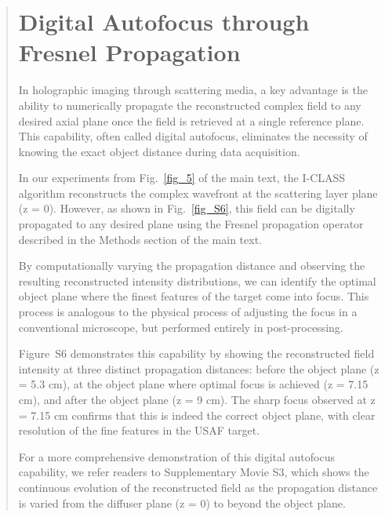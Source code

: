 \documentclass[12pt]{article}
\newenvironment{ourresponse}
    {\begin{tcolorbox}[width=\linewidth,breakable,enhanced,colback=gray!5,colframe=responsecolor!50,title=Response,left=5pt,right=5pt]}
    {\end{tcolorbox}}
\begin{document}
\begin{ourresponse}
\begin{quote}
        \section*{Digital Autofocus through Fresnel Propagation}
        
        In holographic imaging through scattering media, a key advantage is the ability to numerically propagate the reconstructed complex field to any desired axial plane once the field is retrieved at a single reference plane. This capability, often called digital autofocus, eliminates the necessity of knowing the exact object distance during data acquisition.
        
        In our experiments from Fig.~\ref{fig_5} of the main text, the I-CLASS algorithm reconstructs the complex wavefront at the scattering layer plane (z = 0). However, as shown in Fig.~\ref{fig_S6}, this field can be digitally propagated to any desired plane using the Fresnel propagation operator described in the Methods section of the main text. 
        
        By computationally varying the propagation distance and observing the resulting reconstructed intensity distributions, we can identify the optimal object plane where the finest features of the target come into focus. This process is analogous to the physical process of adjusting the focus in a conventional microscope, but performed entirely in post-processing.
        
        Figure~S6 demonstrates this capability by showing the reconstructed field intensity at three distinct propagation distances: before the object plane (z = 5.3 cm), at the object plane where optimal focus is achieved (z = 7.15 cm), and after the object plane (z = 9 cm). The sharp focus observed at z = 7.15 cm confirms that this is indeed the correct object plane, with clear resolution of the fine features in the USAF target.
        
        For a more comprehensive demonstration of this digital autofocus capability, we refer readers to Supplementary Movie S3, which shows the continuous evolution of the reconstructed field as the propagation distance is varied from the diffuser plane (z = 0) to beyond the object plane.


\end{quote}
\end{ourresponse}
\end{document}
